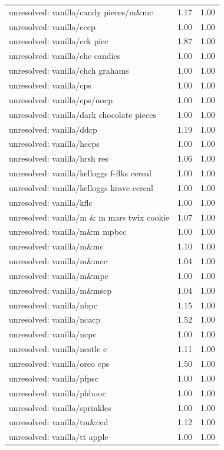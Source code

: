 \begin{table}
\begin{tabular}{lrr}
unresolved: vanilla/candy pieces/m\&mc & 1.17 & 1.00 \\
unresolved: vanilla/cccp & 1.00 & 1.00 \\
unresolved: vanilla/cck piec & 1.87 & 1.00 \\
unresolved: vanilla/chc candies & 1.00 & 1.00 \\
unresolved: vanilla/chch grahams & 1.00 & 1.00 \\
unresolved: vanilla/cps & 1.00 & 1.00 \\
unresolved: vanilla/cps/nocp & 1.00 & 1.00 \\
unresolved: vanilla/dark chocolate pieces & 1.00 & 1.00 \\
unresolved: vanilla/ddcp & 1.19 & 1.00 \\
unresolved: vanilla/hccps & 1.00 & 1.00 \\
unresolved: vanilla/hrsh res & 1.06 & 1.00 \\
unresolved: vanilla/kelloggs f-flks cereal & 1.00 & 1.00 \\
unresolved: vanilla/kelloggs krave cereal & 1.00 & 1.00 \\
unresolved: vanilla/kflc & 1.00 & 1.00 \\
unresolved: vanilla/m \& m mars twix cookie & 1.07 & 1.00 \\
unresolved: vanilla/m\&m mpbcc & 1.00 & 1.00 \\
unresolved: vanilla/m\&mc & 1.10 & 1.00 \\
unresolved: vanilla/m\&mcc & 1.04 & 1.00 \\
unresolved: vanilla/m\&mpc & 1.00 & 1.00 \\
unresolved: vanilla/m\&mscp & 1.04 & 1.00 \\
unresolved: vanilla/nbpc & 1.15 & 1.00 \\
unresolved: vanilla/ncacp & 1.52 & 1.00 \\
unresolved: vanilla/ncpc & 1.00 & 1.00 \\
unresolved: vanilla/nestle c & 1.11 & 1.00 \\
unresolved: vanilla/oreo cps & 1.50 & 1.00 \\
unresolved: vanilla/pfpsc & 1.00 & 1.00 \\
unresolved: vanilla/phbooc & 1.00 & 1.00 \\
unresolved: vanilla/sprinkles & 1.00 & 1.00 \\
unresolved: vanilla/tm\&ccd & 1.12 & 1.00 \\
unresolved: vanilla/tt apple & 1.00 & 1.00 \\

\end{tabular}
\end{table}
